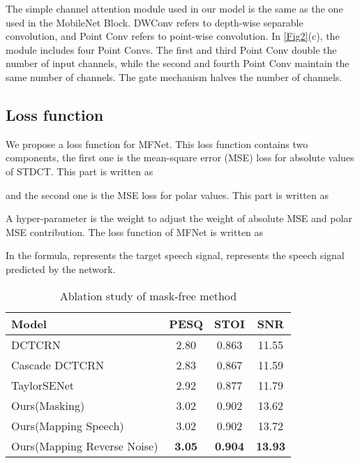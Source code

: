 \documentclass{INTERSPEECH2023}
\begin{document}
The simple channel attention module used in our model is the same as the one used in the MobileNet Block. DWConv refers to depth-wise separable convolution, and Point Conv refers to point-wise convolution. In \ref{Fig2}(c), the module includes four Point Convs. The first and third Point Conv double the number of input channels, while the second and fourth Point Conv maintain the same number of channels. The gate mechanism halves the number of channels.

\subsection{Loss function}
We propose a loss function for MFNet. This loss function contains two components, the first one is the mean-square error (MSE) loss for absolute values of STDCT. This part is written as

and the second one is the MSE loss for polar values. This part is written as

A hyper-parameter  is the weight to adjust the weight of absolute MSE and polar MSE contribution. The loss function of MFNet is written as


In the formula,  represents the target speech signal,  represents the speech signal predicted by the network.

\begin{table}[]
\caption{Ablation study of mask-free method}
\centering
\label{tab2}
\begin{tabular}{@{}lccc@{}}
\toprule
\textbf{Model}               & \textbf{PESQ} & \textbf{STOI}  & \textbf{SNR}   \\ \midrule
DCTCRN \cite{DCTCRN}                & 2.80         & 0.863          & 11.55          \\
Cascade DCTCRN                 & 2.83          & 0.867          & 11.59          \\
TaylorSENet \cite{li2022taylor}                  & 2.92          & 0.877          & 11.79          \\
Ours(Masking)                   & 3.02 & 0.902          & 13.62          \\
Ours(Mapping Speech)         & 3.02          & 0.902          & 13.72          \\
Ours(Mapping Reverse Noise) & \textbf{3.05}          & \textbf{0.904} & \textbf{13.93} \\ \bottomrule
\end{tabular}
\end{table}
\end{document}
